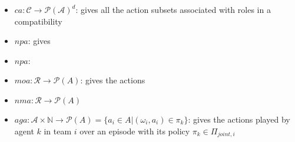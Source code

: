 \documentclass[runningheads]{llncs}
\begin{document}
\begin{itemize}
    \item $ca: \mathcal{C} \rightarrow \mathcal{P(A)}^d$: gives all the action subsets associated with roles in a compatibility
    \item $npa$: gives
    \item $npa$:
    \item $moa: \mathcal{R} \rightarrow \mathcal{P}(A)$: gives the actions
    \item $nma: \mathcal{R} \rightarrow \mathcal{P}(A)$
    \item $aga: \mathcal{A} \times \mathbb{N} \rightarrow \mathcal{P}(A) = \{a_i \in A | (\omega_i, a_i) \in \pi_k\}$: gives the actions played by agent $k$ in team $i$ over an episode with its policy $\pi_k \in \Pi_{joint, i}$
\end{itemize}


\end{document}
